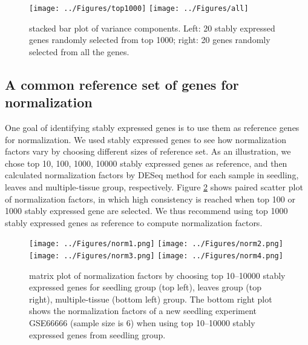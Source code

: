 \documentclass[11pt, a4paper]{article}
\begin{document}
\begin{figure}[!h]
	\centering
	\texttt{[image: ../Figures/top1000]}
	\texttt{[image: ../Figures/all]}
	\caption{stacked bar plot of variance components. Left: 20 stably expressed genes randomly selected from top 1000; right: 20 genes randomly selected from all the genes.}
	\label{fig:all}
\end{figure}




\subsection{A common reference set of genes for normalization}\label{Section:commonReference}
One goal of identifying stably expressed genes is to use them as reference genes for normalization. We used stably expressed genes to see how normalization factors vary by choosing different sizes of reference set.   As an illustration, we chose top 10, 100, 1000, 10000 stably expressed genes as reference, and then calculated normalization factors by DESeq method for each sample in seedling, leaves and multiple-tissue group, respectively. Figure \ref{fig:normfactor} shows paired scatter plot of normalization factors, in which high consistency is reached when top 100 or 1000 stably expressed gene are selected. We thus recommend using top 1000 stably expressed genes as reference to compute normalization factors. %



 \begin{figure}[h!]
\begin{center}
\texttt{[image: ../Figures/norm1.png]}
\texttt{[image: ../Figures/norm2.png]}
\texttt{[image: ../Figures/norm3.png]}
\texttt{[image: ../Figures/norm4.png]}
\caption{\label{fig:normfactor} matrix plot of normalization factors by choosing top 10--10000 stably expressed genes for seedling group (top left), leaves group (top right), multiple-tissue (bottom left) group. The bottom right plot shows the normalization factors of a new seedling experiment GSE66666 (sample size is 6) when using top 10--10000 stably expressed genes from seedling group.}
\end{center}
\end{figure}
\end{document}
